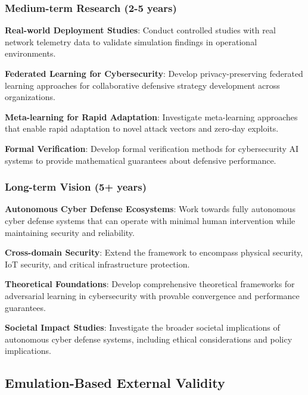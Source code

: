 \documentclass[12pt]{article}
\theoremstyle{definition}
\theoremstyle{plain}
\begin{document}
\subsubsection{Medium-term Research (2-5 years)}

\textbf{Real-world Deployment Studies}: Conduct controlled studies with real network telemetry data to validate simulation findings in operational environments.

\textbf{Federated Learning for Cybersecurity}: Develop privacy-preserving federated learning approaches for collaborative defensive strategy development across organizations.

\textbf{Meta-learning for Rapid Adaptation}: Investigate meta-learning approaches that enable rapid adaptation to novel attack vectors and zero-day exploits.

\textbf{Formal Verification}: Develop formal verification methods for cybersecurity AI systems to provide mathematical guarantees about defensive performance.

\subsubsection{Long-term Vision (5+ years)}

\textbf{Autonomous Cyber Defense Ecosystems}: Work towards fully autonomous cyber defense systems that can operate with minimal human intervention while maintaining security and reliability.

\textbf{Cross-domain Security}: Extend the framework to encompass physical security, IoT security, and critical infrastructure protection.

\textbf{Theoretical Foundations}: Develop comprehensive theoretical frameworks for adversarial learning in cybersecurity with provable convergence and performance guarantees.

\textbf{Societal Impact Studies}: Investigate the broader societal implications of autonomous cyber defense systems, including ethical considerations and policy implications.


\subsection{Emulation-Based External Validity}
\end{document}
